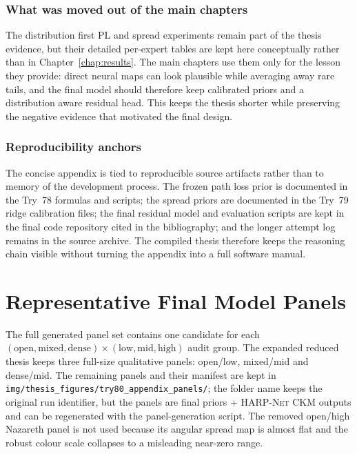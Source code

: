 \subsection{What was moved out of the main chapters}

The distribution first PL and spread experiments remain part of the thesis
evidence, but their detailed per-expert tables are kept here conceptually
rather than in Chapter~\ref{chap:results}. The main chapters use them only for
the lesson they provide: direct neural maps can look plausible while averaging
away rare tails, and the final model should therefore keep calibrated priors
and a distribution aware residual head. This keeps the thesis shorter while
preserving the negative evidence that motivated the final design.

\subsection{Reproducibility anchors}

The concise appendix is tied to reproducible source artifacts rather than to
memory of the development process. The frozen path loss prior is documented in
the Try~78 formulas and scripts; the spread priors are documented in the Try~79
ridge calibration files; the final residual model and evaluation scripts are
kept in the final code repository cited in the bibliography; and the longer
attempt log remains in the source archive. The compiled thesis therefore keeps
the reasoning chain visible without turning the appendix into a full software
manual.

\endgroup

\chapter{Representative Final Model Panels}

The full generated panel set contains one candidate for each
\((\mathrm{open},\mathrm{mixed},\mathrm{dense})\times
(\mathrm{low},\mathrm{mid},\mathrm{high})\) audit group. The expanded reduced
thesis keeps three full-size qualitative panels: open/low, mixed/mid and
dense/mid. The remaining panels and their manifest are kept in
\texttt{img/thesis\_figures/try80\_appendix\_panels/}; the folder name keeps
the original run identifier, but the panels are final priors +
\textsc{HARP-Net CKM} outputs and can be regenerated with the panel-generation
script. The removed open/high Nazareth panel is not used because its
angular spread map is almost flat and the robust colour scale collapses to a
misleading near-zero range.

